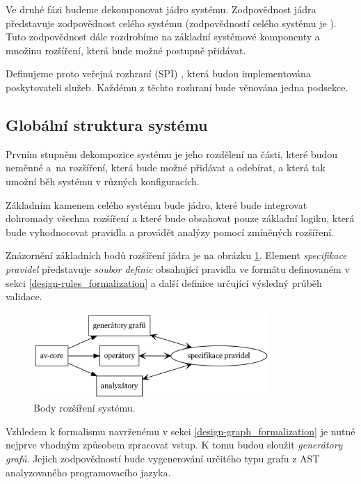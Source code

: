 Ve druhé fázi budeme dekomponovat jádro systému. Zodpovědnost jádra představuje zodpovědnost celého systému (zodpovědností celého systému je ). Tuto zodpovědnost dále rozdrobíme na základní systémové komponenty a množinu rozšíření, která bude možné postupně přidávat.

Definujeme proto veřejná rozhraní (SPI) \cite{spi}, která budou implementována poskytovateli služeb. Každému z těchto rozhraní bude věnována jedna podsekce.

\subsection{Globální struktura systému}

Prvním stupněm dekompozice systému je jeho rozdělení na části, které budou neměnné a~na rozšíření, která bude možné přidávat a odebírat, a která tak umožní běh systému v různých konfiguracích.

Základním kamenem celého systému bude jádro, které bude integrovat dohromady všechna rozšíření a které bude obsahovat pouze základní logiku, která bude vyhodnocovat pravidla a provádět analýzy pomocí zmíněných rozšíření.

Znázornění základních bodů rozšíření jádra je na obrázku \ref{design-system_extensions}. Element \emph{specifikace pravidel} představuje \emph{soubor definic} obsahující pravidla ve formátu definovaném v sekci \ref{design-rules_formalization} a další definice určující výsledný průběh validace.

\begin{figure}[h!]
  \centering
  \includegraphics[width=0.8\textwidth]{./graphs/system_extensions.png}
  \caption{Body rozšíření systému.\label{design-system_extensions}}
\end{figure}

Vzhledem k formalismu navrženému v sekci \ref{design-graph_formalization} je nutné nejprve vhodným způsobem zpracovat vstup. K tomu budou sloužit \emph{generátory grafů}. Jejich zodpovědností bude vygenerování určitého typu grafu z AST analyzovaného programovacího jazyka.

